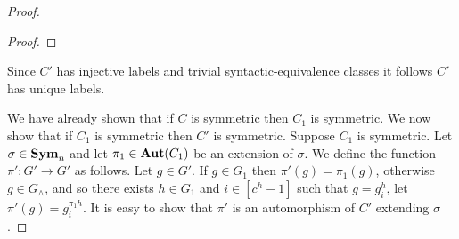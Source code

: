 \documentclass[../paper.tex]{subfiles}
\begin{document}
\begin{proof}
\begin{proof}

  \end{proof}
  
  Since $C'$ has injective labels and trivial syntactic-equivalence classes it
  follows $C'$ has unique labels.

  We have already shown that if $C$ is symmetric then $C_1$ is symmetric. We now
  show that if $C_1$ is symmetric then $C'$ is symmetric. Suppose $C_1$ is
  symmetric. Let $\sigma \in \text{\textbf{Sym}}_n$ and let $\pi_1 \in \text{\textbf{Aut}}(C_1)$ be an
  extension of $\sigma$. We define the function $\pi' : G' \rightarrow G'$ as
  follows. Let $g \in G'$. If $g \in G_1$ then $\pi'(g) = \pi_1(g)$, otherwise
  $g \in G_\land$, and so there exists $h \in G_1$ and $i \in [c^h - 1]$ such
  that $g = g^h_i$, let $\pi'(g) = g^{\pi_1 h}_i$. It is easy to show that
  $\pi'$ is an automorphism of $C'$ extending $\sigma$.


\end{proof}
\end{document}
